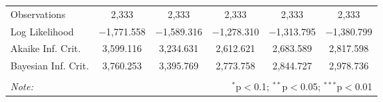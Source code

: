 \begin{table}[!htbp]
\begin{tabular}{@{\extracolsep{5pt}}lccccc}
Observations & 2,333 & 2,333 & 2,333 & 2,333 & 2,333 \\ 
Log Likelihood & $-$1,771.558 & $-$1,589.316 & $-$1,278.310 & $-$1,313.795 & $-$1,380.799 \\ 
Akaike Inf. Crit. & 3,599.116 & 3,234.631 & 2,612.621 & 2,683.589 & 2,817.598 \\ 
Bayesian Inf. Crit. & 3,760.253 & 3,395.769 & 2,773.758 & 2,844.727 & 2,978.736 \\ 
\hline 
\hline \\[-1.8ex] 
\textit{Note:}  & \multicolumn{5}{r}{$^{*}$p$<$0.1; $^{**}$p$<$0.05; $^{***}$p$<$0.01} \\ 
\end{tabular} 
\end{table} 
